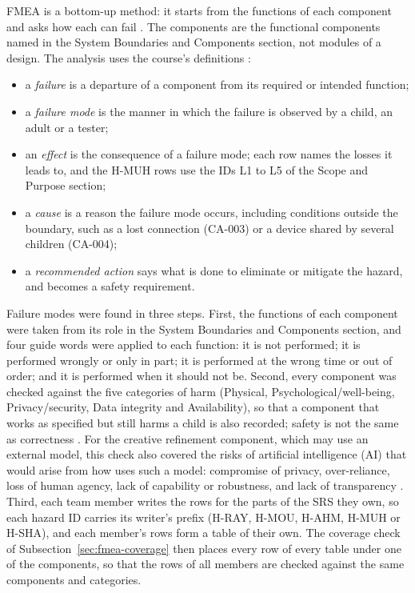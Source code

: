 \documentclass{article}
\begin{document}
FMEA is a bottom-up method: it starts from the functions of each component and
asks how each can fail \citep{Smith2026L08}. The components are the functional
components named in the System Boundaries and Components section, not modules of
a design. The analysis uses the course's definitions \citep{Smith2026L08}:
\begin{itemize}
  \item a \emph{failure} is a departure of a component from its required or
  intended function;
  \item a \emph{failure mode} is the manner in which the failure is observed by
  a child, an adult or a tester;
  \item an \emph{effect} is the consequence of a failure mode; each row names
  the losses it leads to, and the H-MUH rows use the IDs L1 to L5 of the Scope
  and Purpose section;
  \item a \emph{cause} is a reason the failure mode occurs, including conditions
  outside the boundary, such as a lost connection (CA-003) or a device shared by
  several children (CA-004);
  \item a \emph{recommended action} says what is done to eliminate or mitigate
  the hazard, and becomes a safety requirement.
\end{itemize}

Failure modes were found in three steps. First, the functions of each component
were taken from its role in the System Boundaries and Components section, and
four guide words were applied to each function: it is not performed; it is
performed wrongly or only in part; it is performed at the wrong time or out of
order; and it is performed when it should not be. Second, every component was
checked against the five categories of harm (Physical, Psychological/well-being,
Privacy/security, Data integrity and Availability), so that a component that
works as specified but still harms a child is also recorded; safety is not the
same as correctness \citep{Smith2026L08}. For the creative refinement component,
which may use an external model, this check also covered the risks of artificial
intelligence (AI) that would arise from how \progname{} uses such a model:
compromise of privacy, over-reliance, loss of human agency, lack of capability
or robustness, and lack of transparency \citep{SlatteryEtAl2024}. Third, each
team member
writes the rows for the parts of the SRS they own, so each hazard ID carries its
writer's prefix (H-RAY, H-MOU, H-AHM, H-MUH or H-SHA), and each member's rows
form a table of their own. The coverage check of
Subsection~\ref{sec:fmea-coverage} then places every row of every table under
one of the components, so that the rows of all members are checked against the
same components and categories.
\end{document}
